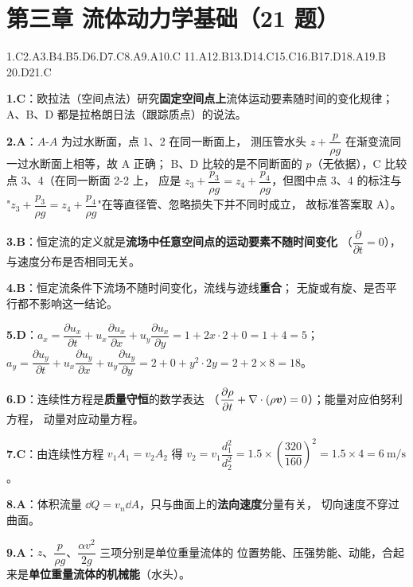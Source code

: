\section*{第三章 流体动力学基础（21 题）}

\noindent 1.C\quad 2.A\quad 3.B\quad 4.B\quad 5.D\quad 6.D\quad 7.C\quad 8.A\quad 9.A\quad 10.C
\quad 11.A\quad 12.B\quad 13.D\quad 14.C\quad 15.C\quad 16.B\quad 17.D\quad 18.A\quad 19.B
\quad 20.D\quad 21.C

\begin{tishi}
\begin{xiaowen}
\item \textbf{1.C}：欧拉法（空间点法）研究\textbf{固定空间点上}流体运动要素随时间的变化规律；
A、B、D 都是拉格朗日法（跟踪质点）的说法。
\item \textbf{2.A}：$A$-$A$ 为过水断面，点 1、2 在同一断面上，
测压管水头 $z+\dfrac{p}{\rho g}$ 在渐变流同一过水断面上相等，故 A 正确；
B、D 比较的是不同断面的 $p$（无依据），C 比较点 3、4（在同一断面 2-2 上，
应是 $z_3+\dfrac{p_3}{\rho g}=z_4+\dfrac{p_4}{\rho g}$，但图中点 3、4 的标注与
"$z_3+\dfrac{p_3}{\rho g}=z_4+\dfrac{p_4}{\rho g}$"在等直径管、忽略损失下并不同时成立，
故标准答案取 A）。
\item \textbf{3.B}：恒定流的定义就是\textbf{流场中任意空间点的运动要素不随时间变化}
（$\dfrac{\partial}{\partial t}=0$），与速度分布是否相同无关。
\item \textbf{4.B}：恒定流条件下流场不随时间变化，流线与迹线\textbf{重合}；
无旋或有旋、是否平行都不影响这一结论。
\item \textbf{5.D}：$a_x=\dfrac{\partial u_x}{\partial t}+u_x\dfrac{\partial u_x}{\partial x}
+u_y\dfrac{\partial u_x}{\partial y}=1+2x\cdot2+0=1+4=5$；
$a_y=\dfrac{\partial u_y}{\partial t}+u_x\dfrac{\partial u_y}{\partial x}
+u_y\dfrac{\partial u_y}{\partial y}=2+0+y^2\cdot2y=2+2\times8=18$。
\item \textbf{6.D}：连续性方程是\textbf{质量守恒}的数学表达
（$\dfrac{\partial\rho}{\partial t}+\nabla\cdot(\rho\bm{v})=0$）；能量对应伯努利方程，
动量对应动量方程。
\item \textbf{7.C}：由连续性方程 $v_1A_1=v_2A_2$ 得
$v_2=v_1\dfrac{d_1^2}{d_2^2}=1.5\times\left(\dfrac{320}{160}\right)^2=1.5\times4=6\ \mathrm{m/s}$。
\item \textbf{8.A}：体积流量 $\dd Q=v_n\dd A$，只与曲面上的\textbf{法向速度}分量有关，
切向速度不穿过曲面。
\item \textbf{9.A}：$z$、$\dfrac{p}{\rho g}$、$\dfrac{\alpha v^2}{2g}$ 三项分别是单位重量流体的
位置势能、压强势能、动能，合起来是\textbf{单位重量流体的机械能}（水头）。

\end{xiaowen}
\end{tishi}
